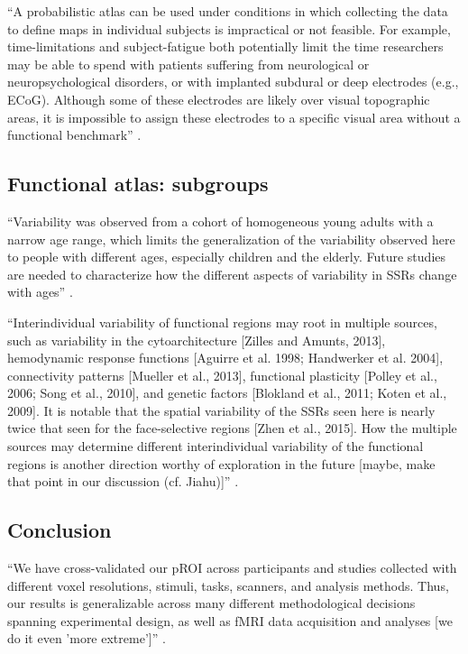 ``A probabilistic atlas can be used under conditions in which collecting
the data to define maps in individual subjects is impractical or not feasible.
%
For example, time-limitations and subject-fatigue both potentially limit the
time researchers may be able to spend with patients suffering from
neurological or neuropsychological disorders, or with implanted subdural or deep
electrodes (e.g., ECoG).
%
Although some of these electrodes are likely over visual topographic areas, it
is impossible to assign these electrodes to a specific visual area without a
functional benchmark'' \citep{wang2015probabilistic}.


\subsection{Functional atlas: subgroups}

``Variability was observed from a cohort of homogeneous young adults with a
narrow age range, which limits the generalization of the variability observed
here to people with different ages, especially children and the elderly.
%
Future studies are needed to characterize how the different aspects of
variability in SSRs change with ages'' \citet{zhen2017quantifying}.

``Interindividual variability of functional regions may root in
multiple sources, such as variability in the cytoarchitecture [Zilles and
Amunts, 2013], hemodynamic response functions [Aguirre et al. 1998; Handwerker
et al. 2004], connectivity patterns [Mueller et al., 2013], functional
plasticity [Polley et al., 2006; Song et al., 2010], and genetic factors
[Blokland et al., 2011; Koten et al., 2009].
%
It is notable that the spatial variability of the SSRs seen here is nearly twice
that seen for the face-selective regions [Zhen et al., 2015]. How the multiple
sources may determine different interindividual variability of the functional
regions is another direction worthy of exploration in the future [maybe, make
that point in our discussion (cf. Jiahu)]'' \citep{zhen2017quantifying}.




\subsection{Conclusion}

``We have cross-validated our pROI across participants and studies collected
with different voxel resolutions, stimuli, tasks, scanners, and analysis
methods.
%
Thus, our results is generalizable across many different methodological
decisions spanning experimental design, as well as fMRI data acquisition and
analyses [we do it even 'more extreme']'' \citep{weiner2018defining}.


